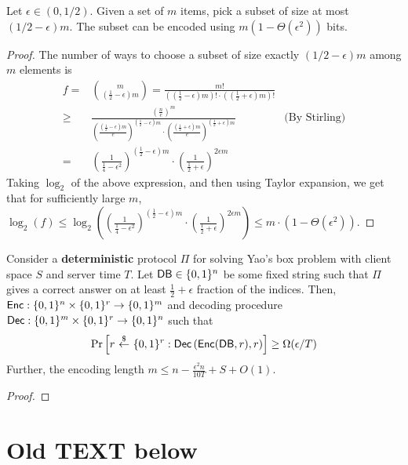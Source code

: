 \begin{fact}
Let $\epsilon \in (0, 1/2)$. 
Given a set of $m$ items, 
pick a subset of size at most $(1/2 - \epsilon)m$. 
The subset 
can be encoded using $m (1- \Theta(\epsilon^2))$ bits. 
\end{fact}
\begin{proof}
The number of ways to choose  
a subset of size exactly $(1/2 - \epsilon)m$
among $m$ elements is 
\begin{align*}
 f = & {m \choose (\frac12 - \epsilon)m }
= \frac{m!}{\left((\frac12 - \epsilon)m\right)! \cdot \left((\frac12 + \epsilon)m\right)!}\\
 \geq & \frac{\left(\frac{n}{e}\right)^m}{\left(\frac{(\frac12-\epsilon)m}{e}
\right)^{(\frac12-\epsilon)m} \cdot \left(\frac{(\frac12+\epsilon)m}{e}
\right)^{(\frac12+\epsilon)m}} & \text{(By Stirling)}\\  
 = & \left(\frac{1}{\frac14- \epsilon^2}\right)^{(\frac12 - \epsilon)m} 
\cdot 
\left(\frac{1}{\frac12 + \epsilon}\right)^{2\epsilon m}
\end{align*}
Taking $\log_2 $ of the 
above expression, 
and then using Taylor expansion, we get that 
for sufficiently large $m$, 
$\log_2(f) \leq 
\log_2\left(
\left(\frac{1}{\frac14- \epsilon^2}\right)^{(\frac12 - \epsilon)m}
\cdot
\left(\frac{1}{\frac12 + \epsilon}\right)^{2\epsilon m}
\right) \leq m \cdot (1 - \Theta(\epsilon^2))$.
\end{proof}


\begin{lemma}
Consider a {\bf deterministic}
protocol $\Pi$ for solving Yao's box problem with 
client space $S$ and server time $T$. 
Let ${\sf DB} \in \{0, 1\}^n$ be some fixed string 
such that 
$\Pi$ gives a correct answer
on  
at least $\frac{1}{2} + \epsilon$ 
fraction of the indices.
Then, 
${\sf Enc}: \{0, 1\}^n \times \{0, 1\}^r \rightarrow \{0, 1\}^m$
and decoding procedure
${\sf Dec}: \{0, 1\}^m \times \{0, 1\}^r \rightarrow \{0, 1\}^n$
such that
\[
\Pr\left[r ~{\overset{\$}{\leftarrow}}~ \{0, 1\}^r: 
{\sf Dec}\left({\sf Enc}({\sf DB}, r), r\right) 
\right]
\geq 
\Omega(\epsilon/T)
\]
Further, the encoding length 
$m \leq n - \frac{\epsilon^2 n}{10T} + S + O(1)$.
\end{lemma}
\begin{proof}
\end{proof}


\section*{Old TEXT below}
\vspace{5mm}

